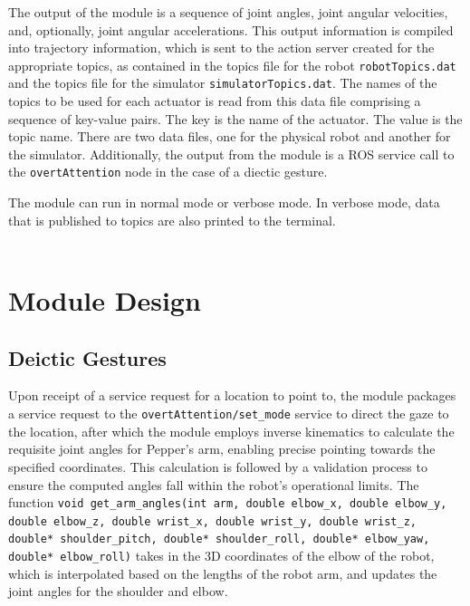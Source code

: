\documentclass{CSSRforAfrica}
\begin{document}
The output of the module is a sequence of joint angles, joint angular velocities, and, optionally, joint angular
accelerations. This output information is compiled into trajectory information, which is sent to the action server created for the appropriate topics, as contained in the topics file for the robot \texttt{robotTopics.dat} and the topics file for the simulator \texttt{simulatorTopics.dat}. The names of the topics to be used for each actuator is read from this data file comprising a sequence of key-value pairs. The key is the name of the actuator. The value is the topic name. There are two data files, one for the physical robot and another for the simulator.  Additionally, the output from the module is a ROS service call to the \texttt{overtAttention} node in the case of a diectic gesture.

The module can run in normal mode or verbose mode. In verbose mode, data that is published to
topics are also printed to the terminal.
 \\~\\

\newpage
\section{Module Design}



\subsection{Deictic Gestures}

Upon receipt of a service request for a location to point to, the module packages a service request to the \texttt{overtAttention/set\_mode} service to direct the gaze to the location, after which the module employs inverse kinematics to calculate the requisite joint angles for Pepper's arm, enabling precise pointing towards the specified coordinates. This calculation is followed by a validation process to ensure the computed angles fall within the robot's operational limits. The function {\footnotesize \texttt{void get\_arm\_angles(int arm, double elbow\_x, double elbow\_y, double elbow\_z, double wrist\_x, double wrist\_y, double wrist\_z, double* shoulder\_pitch, double* shoulder\_roll, double* elbow\_yaw, double* elbow\_roll)}} takes in the 3D coordinates of the elbow of the robot, which is interpolated based on the lengths of the robot arm, and updates the joint angles for the shoulder and elbow.
\end{document}
